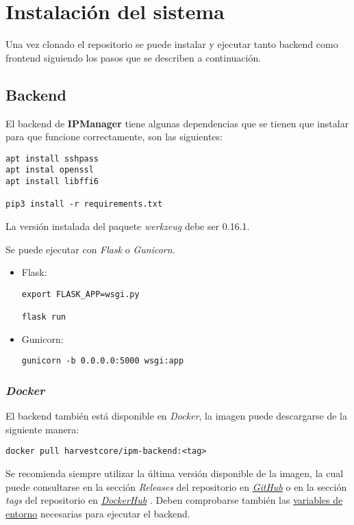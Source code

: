 \chapter{Instalación del sistema}

Una vez clonado el repositorio se puede instalar y ejecutar tanto backend como frontend siguiendo los pasos que se describen a continuación.

\section{Backend}
El backend de \textbf{IPManager} tiene algunas dependencias que se tienen que instalar para que funcione correctamente, son las siguientes:

\begin{lstlisting}
apt install sshpass
apt instal openssl
apt install libffi6

pip3 install -r requirements.txt
\end{lstlisting}

La versión instalada del paquete \textit{werkzeug} debe ser 0.16.1.

Se puede ejecutar con \textit{Flask} o \textit{Gunicorn}.
\begin{itemize}
	\item Flask:
\begin{lstlisting}
export FLASK_APP=wsgi.py

flask run
\end{lstlisting}
	
	\item Gunicorn:
\begin{lstlisting}
gunicorn -b 0.0.0.0:5000 wsgi:app
\end{lstlisting}
	
\end{itemize}

\subsection{\textit{Docker}}
El backend también está disponible en \textit{Docker}, la imagen puede descargarse de la siguiente manera:

\begin{lstlisting}
docker pull harvestcore/ipm-backend:<tag>
\end{lstlisting}

Se recomienda siempre utilizar la última versión disponible de la imagen, la cual puede consultarse en la sección \textit{Releases} del repositorio en  \href{https://github.com/harvestcore/tfg/releases}{\textit{GitHub}} \cite{ipmanagerreleases} o en la sección \textit{tags} del repositorio en \href{https://hub.docker.com/r/harvestcore/ipm-backend/tags}{\textit{DockerHub}} \cite{dockerhubtagback}. Deben comprobarse también las \hyperref[sec:variables]{variables de entorno} necesarias para ejecutar el backend.

